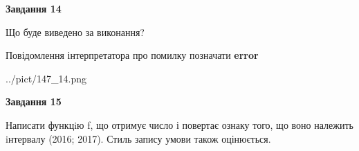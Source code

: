 \documentclass[11pt, ukrainian]{article}
\begin{document}
{\begin {large}
{\begin {center}\textbf{Завдання 14}\end {center}}\par
Що буде виведено за виконання? \par
Повідомлення інтерпретатора про помилку позначати \textbf{error}

\begin{center}
	{../pict/147_14.png}
\end{center}
\newpage

{\begin {center}\textbf{Завдання 15}\end {center}}\par

Написати функцiю f, що отримує число і повертає ознаку того, що воно належить iнтервалу (2016; 2017). Стиль запису умови також оцінюється.\par
\newpage

\end {large}}
\end{document}
